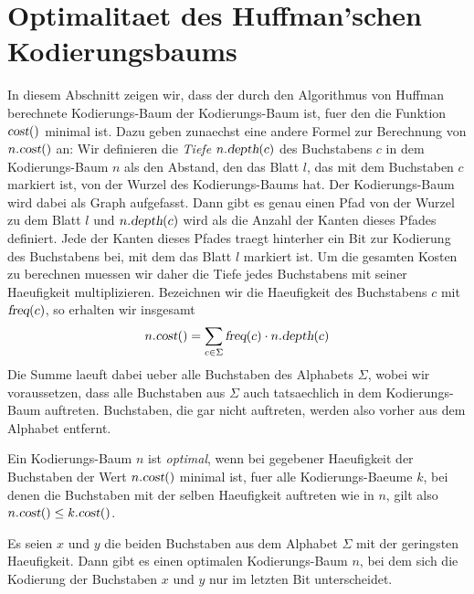 \section{Optimalitaet des Huffman'schen Kodierungsbaums}
In diesem Abschnitt zeigen wir, dass der durch den Algorithmus von Huffman berechnete Kodie\-rungs-Baum der
Kodierungs-Baum ist, fuer den die Funktion $\textsl{cost}()$ minimal ist.  Dazu geben zunaechst eine andere
Formel zur Berechnung von $n.\textsl{cost}()$ an:  Wir definieren die \emph{Tiefe}
$n.\textsl{depth}(c)$ des Buchstabens $c$ in dem Kodierungs-Baum $n$ als den Abstand, den das Blatt $l$,
das mit dem Buchstaben $c$ markiert ist, von der Wurzel des Kodierungs-Baums hat.  Der Kodierungs-Baum
wird dabei als Graph aufgefasst.  Dann gibt es genau einen Pfad von der Wurzel zu dem Blatt $l$ und 
$n.\textsl{depth}(c)$ wird als die Anzahl der Kanten dieses Pfades definiert.
Jede der Kanten dieses Pfades traegt hinterher ein Bit zur 
Kodierung des Buchstabens bei, mit dem das Blatt $l$ markiert ist.  Um die gesamten Kosten zu berechnen
muessen wir daher die Tiefe jedes Buchstabens mit seiner Haeufigkeit multiplizieren.  Bezeichnen wir die
Haeufigkeit des Buchstabens $c$ mit $\textsl{freq}(c)$, so erhalten wir insgesamt
\begin{equation}
  \label{eq:cost}
  n.\textsl{cost}() = \sum\limits_{c\in\Sigma} \textsl{freq}(c) \cdot n.\textsl{depth}(c)
\end{equation}
Die Summe laeuft dabei ueber alle Buchstaben des Alphabets $\Sigma$, wobei wir voraussetzen,
dass alle Buchstaben aus $\Sigma$ auch tatsaechlich in dem Kodierungs-Baum auftreten.
Buchstaben, die gar nicht auftreten, werden also vorher aus dem Alphabet entfernt.

\begin{Definition}
  Ein Kodierungs-Baum $n$ ist \emph{optimal}, wenn bei gegebener Haeufigkeit der Buchstaben
  der Wert $n.\textsl{cost}()$ minimal ist, fuer alle Kodierungs-Baeume $k$, bei denen die
  Buchstaben mit der selben Haeufigkeit auftreten wie in $n$,  gilt also
  \\[0.2cm]
  \hspace*{1.3cm} $n.\textsl{cost}() \leq k.\textsl{cost}()$.
\end{Definition}


\begin{Lemma}
  \label{huffman:l1}
  Es seien $x$ und $y$ die beiden Buchstaben aus dem Alphabet $\Sigma$ mit der geringsten Haeufigkeit.  Dann
  gibt es einen optimalen Kodierungs-Baum $n$, bei dem sich die Kodierung der Buchstaben $x$ und $y$ nur im
  letzten Bit unterscheidet.
\end{Lemma}

